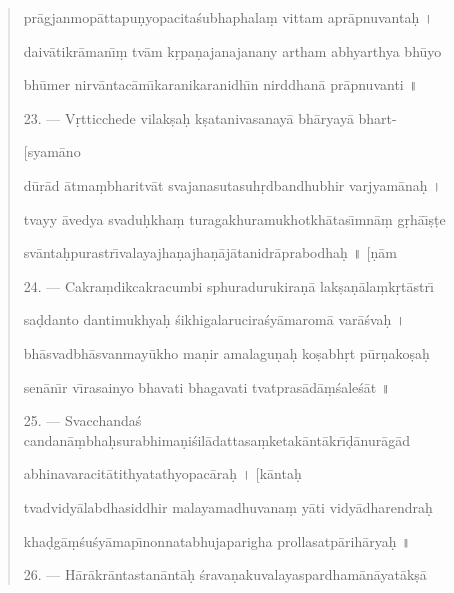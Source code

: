 \documentclass[a4paper, 11pt, oneside, french]{article}
\begin{document}
\begin{quotation}
pr\={a}gjanmop\={a}ttapu\d{n}yopacita\'{s}ubhaphala\d{m} vittam apr\={a}pnuvanta\d{h} \texthindi{।}

daiv\={a}tikr\={a}man\={\i}\d{m} tv\={a}m k\d{r}pa\d{n}ajanajanany artham abhyarthya bh\={u}yo

bh\={u}mer nirv\={a}ntac\={a}m\={\i}karanikaranidh\={\i}n nirddhan\={a} pr\={a}pnuvanti \texthindi{॥}

\bigskip

23. --- V\d{r}tticchede vilak\d{s}a\d{h} k\d{s}atanivasanay\={a} bh\={a}ryay\={a} bhart-

\hspace*{25mm}[syam\={a}no

d\={u}r\={a}d \={a}tma\d{m}bharitv\={a}t svajanasutasuh\d{r}dbandhubhir varjyam\={a}na\d{h} \texthindi{।}

tvayy \={a}vedya svadu\d{h}kha\d{m} turagakhuramukhotkh\={a}tas\={\i}mn\={a}\d{m} g\d{r}h\={a}\={\i}\d{s}\d{t}e

sv\={a}nta\d{h}purastr\={\i}valayajha\d{n}ajha\d{n}\={a}j\={a}tanidr\={a}prabodha\d{h} \texthindi{॥} [\d{n}\={a}m

\bigskip

24. --- Cakra\d{m}dikcakracumbi sphuradurukira\d{n}\={a} lak\d{s}a\d{n}\={a}la\d{m}k\d{r}t\={a}str\={\i}

sa\d{d}danto dantimukhya\d{h} \'{s}ikhigalarucira\'{s}y\={a}marom\={a} var\={a}\'{s}va\d{h} \texthindi{।}

bh\={a}svadbh\={a}svanmay\={u}kho ma\d{n}ir amalagu\d{n}a\d{h} ko\d{s}abh\d{r}t p\={u}r\d{n}ako\d{s}a\d{h}

sen\={a}n\={\i}r v\={\i}rasainyo bhavati bhagavati tvatpras\={a}d\={a}\d{m}\'{s}ale\'{s}\={a}t \texthindi{॥}

\bigskip

25. --- Svacchanda\'{s} candan\={a}\d{m}bha\d{h}surabhima\d{n}i\'{s}il\={a}dattasa\d{m}ketak\={a}nt\={a}kr\={\i}\d{d}\={a}nur\={a}g\={a}d

abhinavaracit\={a}tithyatathyopac\={a}ra\d{h} \texthindi{।} [k\={a}nta\d{h}

tvadvidy\={a}labdhasiddhir malayamadhuvana\d{m} y\={a}ti vidy\={a}dharendra\d{h}

kha\d{d}g\={a}\d{m}\'{s}u\'{s}y\={a}map\={\i}nonnatabhujaparigha prollasatp\={a}rih\={a}rya\d{h} \texthindi{॥}

\bigskip

26. --- H\={a}r\={a}kr\={a}ntastan\={a}nt\={a}\d{h} \'{s}rava\d{n}akuvalayaspardham\={a}n\={a}yat\={a}k\d{s}\={a}


\end{quotation}
\end{document}

